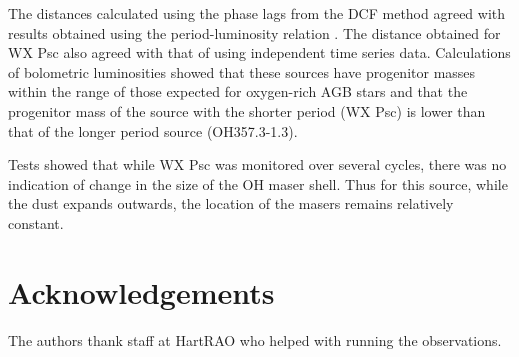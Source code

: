 \documentclass[usenatbib,usegraphicx]{mn2e}
\begin{document}
The distances calculated using the phase lags from the DCF method agreed
with results obtained using the period-luminosity relation
\citep{OliWhtlkMar01}.  The distance obtained for WX Psc also agreed with
that of \citet{vLvdHvS90} using independent time series data.  Calculations
of bolometric luminosities showed that these sources have progenitor masses
within the range of those expected for oxygen-rich AGB stars and that the
progenitor mass of the source with the shorter period (WX Psc) is lower than
that of the longer period source (OH357.3-1.3).

Tests showed that while WX Psc was monitored over several cycles, there was
no indication of change in the size of the OH maser shell.  Thus for this
source, while the dust expands outwards, the location of the masers remains
relatively constant.

      
   
\section*{Acknowledgements}

The authors thank staff at HartRAO who
helped with running the observations.





\label{lastpage}
\end{document}
